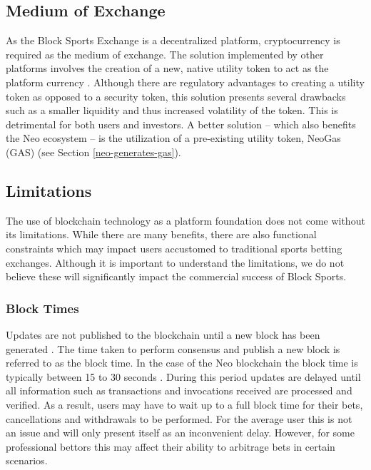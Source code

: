 \documentclass{article}
\begin{document}
	\subsection{Medium of Exchange} \label{medium-of-exchange}
As the Block Sports Exchange is a decentralized platform, cryptocurrency is required as the medium of exchange. The solution implemented by other platforms involves the creation of a new, native utility token to act as the platform currency \cite{decent,wagerr,betley}. Although there are regulatory advantages to creating a utility token as opposed to a security token, this solution presents several drawbacks such as a smaller liquidity and thus increased volatility of the token.
This is detrimental for both users and investors. A better solution -- which also benefits the Neo ecosystem -- is the utilization of a pre-existing utility token, NeoGas (GAS) (see Section \ref{neo-generates-gas}). 

	\subsection{Limitations} \label{limitations}
The use of blockchain technology as a platform foundation does not come without its limitations. While there are many benefits, there are also functional constraints which may impact users accustomed to traditional sports betting exchanges. Although it is important to understand the limitations, we do not believe these will significantly impact the commercial success of Block Sports.

		\subsubsection{Block Times} \label{block-times}
Updates are not published to the blockchain until a new block has been generated \cite{neo-whitepaper}. The time taken to perform consensus and publish a new block is referred to as the block time. In the case of the Neo blockchain the block time is typically between 15 to 30 seconds \cite{monitor}. During this period updates are delayed until all information such as transactions and invocations received are processed and verified. As a result, users may have to wait up to a full block time for their bets, cancellations and withdrawals to be performed. For the average user this is not an issue and will only present itself as an inconvenient delay. However, for some professional bettors this may affect their ability to arbitrage bets in certain scenarios.
\end{document}
